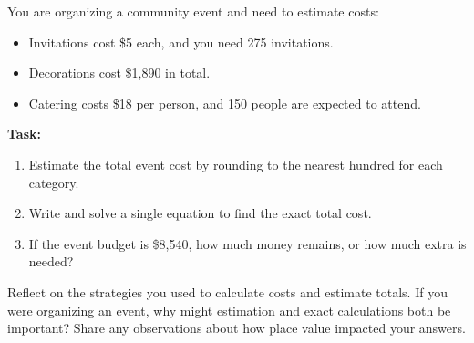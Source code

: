 \documentclass[12pt]{article}
\begin{document}
\begin{tcolorbox}[colframe=black!60, colback=white, 
coltitle=black, colbacktitle=black!15, fonttitle=\bfseries\Large, 
title=Performance Task: Plan a Community Event, halign title=center, left=10pt, right=10pt, top=10pt, bottom=50pt]
You are organizing a community event and need to estimate costs:
\begin{itemize}
    \item Invitations cost \$5 each, and you need 275 invitations.
    \item Decorations cost \$1,890 in total.
    \item Catering costs \$18 per person, and 150 people are expected to attend.
\end{itemize}
\textbf{Task:}
\begin{enumerate}[itemsep=7em]
   
    \item Estimate the total event cost by rounding to the nearest hundred for each category.
    \item Write and solve a single equation to find the exact total cost.
    \item If the event budget is \$8,540, how much money remains, or how much extra is needed?
    \vspace{1em}
\end{enumerate}
\end{tcolorbox}

\begin{tcolorbox}[colframe=black!60, colback=white, 
coltitle=black, colbacktitle=black!15, fonttitle=\bfseries\Large, 
title=Reflection, halign title=center, left=10pt, right=10pt, top=10pt, bottom=50pt]
Reflect on the strategies you used to calculate costs and estimate totals. If you were organizing an event, why might estimation and exact calculations both be important? Share any observations about how place value impacted your answers.\vspace{1cm}

\end{tcolorbox}
\end{document}
